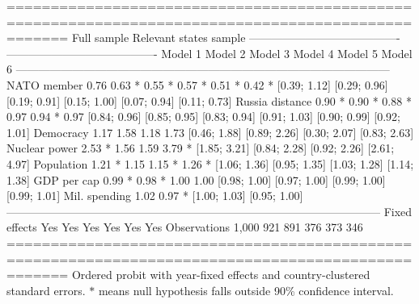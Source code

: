 
===================================================================================================
                                Full sample                         Relevant states sample         
                 ----------------------------------------  ----------------------------------------
                 Model 1       Model 2       Model 3       Model 4       Model 5       Model 6     
---------------------------------------------------------------------------------------------------
NATO member          0.76        0.63 *        0.55 *        0.57 *        0.51 *        0.42 *    
                 [0.39; 1.12]  [0.29; 0.96]  [0.19; 0.91]  [0.15; 1.00]  [0.07; 0.94]  [0.11; 0.73]
Russia distance      0.90 *      0.90 *        0.88 *        0.97          0.94 *        0.97      
                 [0.84; 0.96]  [0.85; 0.95]  [0.83; 0.94]  [0.91; 1.03]  [0.90; 0.99]  [0.92; 1.01]
Democracy                        1.17          1.58                        1.18          1.73      
                               [0.46; 1.88]  [0.89; 2.26]                [0.30; 2.07]  [0.83; 2.63]
Nuclear power                    2.53 *        1.56                        1.59          3.79 *    
                               [1.85; 3.21]  [0.84; 2.28]                [0.92; 2.26]  [2.61; 4.97]
Population                       1.21 *        1.15                        1.15 *        1.26 *    
                               [1.06; 1.36]  [0.95; 1.35]                [1.03; 1.28]  [1.14; 1.38]
GDP per cap                      0.99 *        0.98 *                      1.00          1.00      
                               [0.98; 1.00]  [0.97; 1.00]                [0.99; 1.00]  [0.99; 1.01]
Mil. spending                                  1.02                                      0.97 *    
                                             [1.00; 1.03]                              [0.95; 1.00]
---------------------------------------------------------------------------------------------------
Fixed effects      Yes         Yes           Yes           Yes           Yes           Yes         
Observations     1,000         921           891           376           373           346         
===================================================================================================
Ordered probit with year-fixed effects and country-clustered standard errors. $*$ means null hypothesis falls outside 90\% confidence interval.
